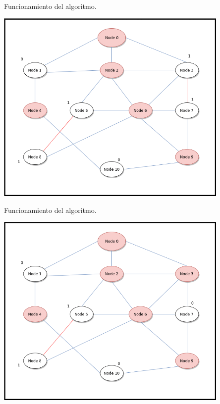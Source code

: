 \documentclass[10pt]{beamer}
\begin{document}
\begin{frame}{Funcionamiento del algoritmo.}{}
	\begin{block}{}
		\includegraphics[width=0.85\textwidth]{gif-6.png}
	\end{block}
\end{frame}
\begin{frame}{Funcionamiento del algoritmo.}{}
	\begin{block}{}
		\includegraphics[width=0.85\textwidth]{gif-7.png}
	\end{block}
\end{frame}
\end{document}
